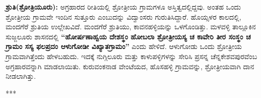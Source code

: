 \textbf{ಶ್ರುತಿ(ಶ್ರೋತ್ರಿಯೂರು):} ಅಗ್ರಹಾರದ ರೀತಿಯಲ್ಲಿ ಶ್ರೋತ್ರೀಯ ಗ್ರಾಮಗಳೂ ಅಸ್ತಿತ್ವದಲ್ಲಿದ್ದವು. ಅಂತಹ ಒಂದು ಶ್ರೋತ್ರೀಯ ಗ್ರಾಮವೇ ಇಂದಿನ ಸುತ್ತೂರು ಎಂಬುದನ್ನು ವಿದ್ವಾಂಸರು ಗುರುತಿಸಿದ್ದಾರೆ. ಹೊಯ್ಸಳರ ಕಾಲದಲ್ಲಿ, ಮಂದಗೆರೆ ಶ್ರುತಿಯ ಉಲ್ಲೇಖವಿದೆ. ಮಂದಗೆರೆ ಶ್ರುತಿಯು, ಕಾವನಹಳ್ಳಿಯನ್ನು ಒಳಗೊಂಡಿತ್ತು. ಮಳವಳ್ಳಿ ತಾಲ್ಲೂಕಿನ ಸುಜ್ಜಲೂರು ಶಾಸನದಲ್ಲಿ \textbf{“ಹೋರ್ಷಣಾಹ್ವಯ ದೇಶಸ್ಥಂ ಹೋಬಲಾ ಶ್ರೋತ್ರೀಯಸ್ಯ ಚ ಕಾವೇರಿ ತೀರ ಸಂಸ್ಥಂ ಚ ಗ್ರಾಮಂ ಸಸ್ಯ ಫಲಪ್ರದಂ ಆಳುಗೋಡೀ ವಿಖ್ಯಾತಗ್ರಾಮಂ”} ಎಂದು ಹೇಳಿದೆ. ಆಳುಗೋಡು ಒಂದು ಶ್ರೋತ್ರೀಯ ಗ್ರಾಮವಾಗಿತ್ತೆಂದು ಹೇಳಬಹುದು. ಇದಕ್ಕೆ ನುಗ್ಗಿಲೂರು ಮತ್ತು ಕಾಳುಪಳ್ಳಿಗಳನ್ನು ಸೇರಿಸಿ ಪ್ರಸನ್ನ ಚೆನ್ನಕೇಶವಪುರವೆಂಬ ಅಗ್ರಹಾರವನ್ನಾಗಿ ಮಾಡಲಾಯಿತು. ಕುರುವಂಕನಾಡ ವೇಂಟೆಯದ, ಹೊಸಹಳ್ಳಿ ಗ್ರಾಮವನ್ನು, ಶ್ರೋತ್ರೀಯವಾಗಿ ದಾನ ನೀಡಲಾಗಿತ್ತು.

\begin{center}
***
\end{center}

\theendnotes

